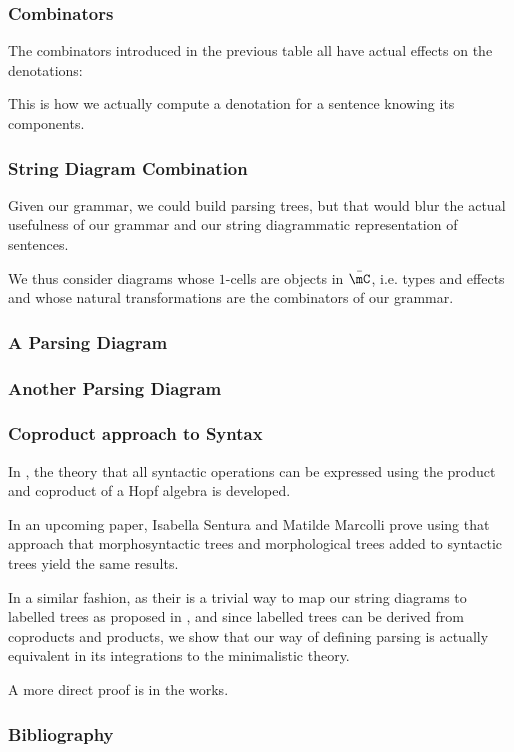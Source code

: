 \documentclass[math, english, info, noamsthm]{beamercours}
\begin{document}
\begin{frame}
	\frametitle{Combinators}
	The combinators introduced in the previous table all have actual effects on the denotations:
	\begin{center}
		\scriptsize
		
	\end{center}
	This is how we actually compute a denotation for a sentence knowing its components.
\end{frame}

\begin{frame}
	\frametitle{String Diagram Combination}
	Given our grammar, we could build parsing trees, but that would blur the actual usefulness of our grammar and our string diagrammatic representation of sentences.

	\medskip

	We thus consider diagrams whose $1$-cells are objects in $\bar{\mC}$, i.e. types and effects and whose natural transformations are the combinators of our grammar.
\end{frame}

\begin{frame}
	\frametitle{A Parsing Diagram}
	\vspace{-1.5cm}
	\begin{center}
	\end{center}
\end{frame}

\begin{frame}
	\frametitle{Another Parsing Diagram}
	\begin{center}
	\end{center}
\end{frame}

\begin{frame}
	\frametitle{Coproduct approach to Syntax}
	In \cite{marcollimatildeetchomskynoametberwickrobertc.MathematicalStructureSyntactic},
	the theory that all syntactic operations can be expressed using the product and coproduct of a
	Hopf algebra is developed.

	\smallskip

	In an upcoming paper, Isabella Sentura and Matilde Marcolli prove using
	that approach that morphosyntactic trees and morphological trees added to
	syntactic trees yield the same results.

	In a similar fashion, as their is a trivial way to map our string diagrams
	to labelled trees as proposed in \cite{bumfordEffectdrivenInterpretationFunctors2025},
	and since labelled trees can be derived from coproducts and products, we
	show that our way of defining parsing is actually equivalent in its
	integrations to the minimalistic theory.

	\medskip

	A more direct proof is in the works.
\end{frame}

\appendix
\begin{frame}[allowframebreaks]
	\frametitle{Bibliography}
	\printbibliography{}
\end{frame}
\end{document}
